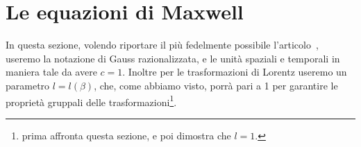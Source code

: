 
\section{Le equazioni di Maxwell}
In questa sezione, volendo riportare il pi\`u fedelmente possibile
l'articolo~\cite{carro1}, useremo la notazione di Gauss razionalizzata,
e le unit\`a spaziali e temporali in maniera tale da avere $c =
1$. Inoltre per le trasformazioni di Lorentz useremo un parametro $l = l
(\beta)$, che, come abbiamo visto, \poin {} porr\`a pari a 1 per
garantire le propriet\`a gruppali delle trasformazioni\footnote{\poin{}
prima affronta questa sezione, e poi dimostra che $l=1$.
}.

